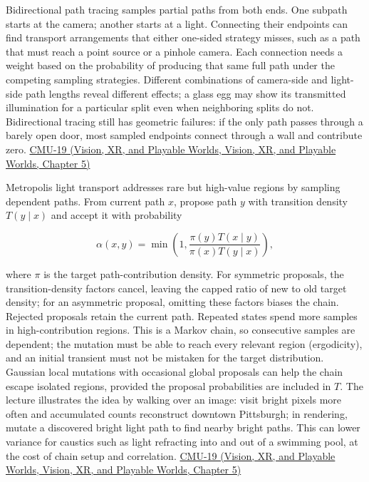 Bidirectional path tracing samples partial paths from both ends. One subpath starts at the camera; another starts at a light. Connecting their endpoints can find transport arrangements that either one-sided strategy misses, such as a path that must reach a point source or a pinhole camera. Each connection needs a weight based on the probability of producing that same full path under the competing sampling strategies. Different combinations of camera-side and light-side path lengths reveal different effects; a glass egg may show its transmitted illumination for a particular split even when neighboring splits do not. Bidirectional tracing still has geometric failures: if the only path passes through a barely open door, most sampled endpoints connect through a wall and contribute zero. \href{../07-Vision-XR-and-Playable-Worlds/main.pdf\#nameddest=04-visual-computing-ii-ch036-cmu-19---variance-reduction}{CMU-19 (Vision, XR, and Playable Worlds, Vision, XR, and Playable Worlds, Chapter 5)}

Metropolis light transport addresses rare but high-value regions by sampling dependent paths. From current path \(x\), propose path \(y\) with transition density \(T(y\mid x)\) and accept it with probability

\[
\alpha(x,y)=\min\!\left(1,\frac{\pi(y)T(x\mid y)}{\pi(x)T(y\mid x)}\right),
\]

where \(\pi\) is the target path-contribution density. For symmetric proposals, the transition-density factors cancel, leaving the capped ratio of new to old target density; for an asymmetric proposal, omitting these factors biases the chain. Rejected proposals retain the current path. Repeated states spend more samples in high-contribution regions. This is a Markov chain, so consecutive samples are dependent; the mutation must be able to reach every relevant region (ergodicity), and an initial transient must not be mistaken for the target distribution. Gaussian local mutations with occasional global proposals can help the chain escape isolated regions, provided the proposal probabilities are included in \(T\). The lecture illustrates the idea by walking over an image: visit bright pixels more often and accumulated counts reconstruct downtown Pittsburgh; in rendering, mutate a discovered bright light path to find nearby bright paths. This can lower variance for caustics such as light refracting into and out of a swimming pool, at the cost of chain setup and correlation. \href{../07-Vision-XR-and-Playable-Worlds/main.pdf\#nameddest=04-visual-computing-ii-ch036-cmu-19---variance-reduction}{CMU-19 (Vision, XR, and Playable Worlds, Vision, XR, and Playable Worlds, Chapter 5)}

